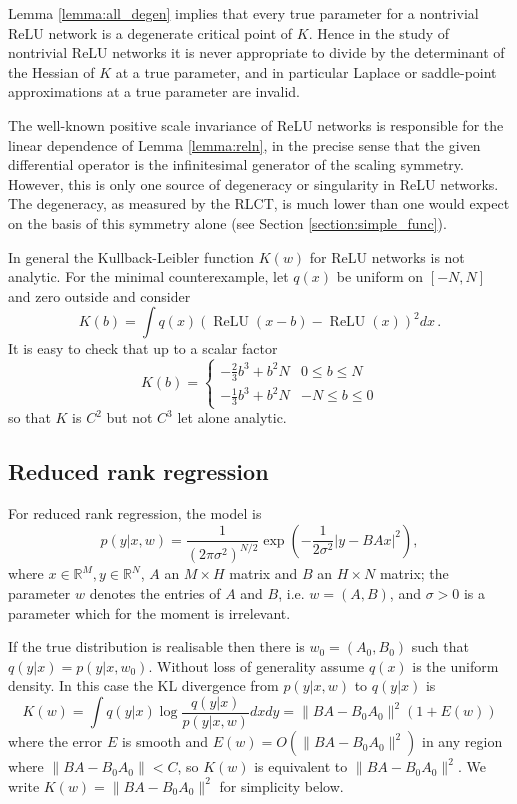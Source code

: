 \documentclass{article} %
\begin{document}
\begin{remark}\label{remark:byebye_laplace}
Lemma \ref{lemma:all_degen} implies that every true parameter for a nontrivial ReLU network is a degenerate critical point of $K$. Hence in the study of nontrivial ReLU networks it is never appropriate to divide by the determinant of the Hessian of $K$ at a true parameter, and in particular Laplace or saddle-point approximations at a true parameter are invalid.
\end{remark}

The well-known positive scale invariance of ReLU networks \citep{phuong2020functional} is responsible for the linear dependence of Lemma \ref{lemma:reln}, in the precise sense that the given differential operator is the infinitesimal generator \citep[\S IV.3]{boothby1986introduction} of the scaling symmetry. However, this is only one source of degeneracy or singularity in ReLU networks. The degeneracy, as measured by the RLCT, is much lower than one would expect on the basis of this symmetry alone (see Section \ref{section:simple_func}).

\begin{example}\label{example:not_analytic} In general the Kullback-Leibler function $K(w)$ for ReLU networks is not analytic. For the minimal counterexample, let $q(x)$ be uniform on $[-N, N]$ and zero outside and consider
\[
K(b) = \int q(x) ( \operatorname{ReLU}(x - b) - \operatorname{ReLU}(x) )^2 dx\,.
\]
It is easy to check that up to a scalar factor
\[
K(b) = \begin{cases} -\tfrac{2}{3} b^3 + b^2 N & 0 \le b \le N \\
-\tfrac{1}{3} b^3 + b^2 N & -N \le b \le 0
\end{cases}
\]
so that $K$ is $C^2$ but not $C^3$ let alone analytic.
\end{example}

\subsection{Reduced rank regression} \label{appendix:reducedrank}
For reduced rank regression, the model is
$$
p( y \rvert x, w) = \frac{1}{(2\pi \sigma^2)^{N/2}} \exp\left( -
\frac{1}{2 \sigma^2} | y - BA x|^2\right),
$$
where $x \in \mathbb{R}^M, y \in \mathbb{R}^N$, $A$ an $M \times H$
matrix and $B$ an $H \times N$ matrix; the parameter $w$ denotes the
entries of $A$ and $B$, i.e. $w = (A, B)$, and $\sigma > 0$ is a
parameter which for the moment is irrelevant.

If the true distribution is realisable then there is $w_0 = (A_0,
B_0)$ such that $q(y|x) = p(y \rvert x, w_0)$.  Without loss of generality assume $q(x)$ is the uniform density. In this case the KL
divergence from $p(y \rvert x, w)$ to $q(y|x)$ is
$$
K(w) = \int q(y|x) \log \frac{q(y|x)}{p(y|x, w)} dxdy = \| BA -
B_0A_0 \|^2 \left( 1 + E(w) \right)
$$
where the error $E$ is smooth and $E(w) = O(\| BA -
B_0A_0 \|^2)$ in any region where $\| BA -
B_0A_0 \| < C$, so $K(w)$ is equivalent to $\|BA - B_0 A_0\|^2$.  We
write $K(w) = \|BA - B_0 A_0\|^2$ for simplicity below.
\end{document}
